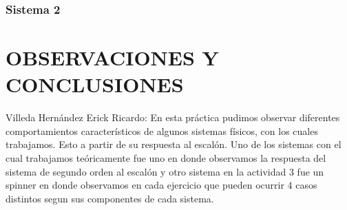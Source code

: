 \subsubsection{Sistema 2}

\section{OBSERVACIONES Y CONCLUSIONES}

Villeda Hernández Erick Ricardo: En esta práctica pudimos observar diferentes comportamientos característicos de algunos sistemas físicos, con los cuales trabajamos. Esto a partir de su respuesta al escalón. Uno de los sistemas con el cual trabajamos teóricamente fue uno en donde observamos la respuesta del sistema de segundo orden al escalón y otro sistema en la actividad 3 fue un spinner en donde observamos en cada ejercicio que pueden ocurrir 4 casos distintos segun sus componentes de cada sistema.